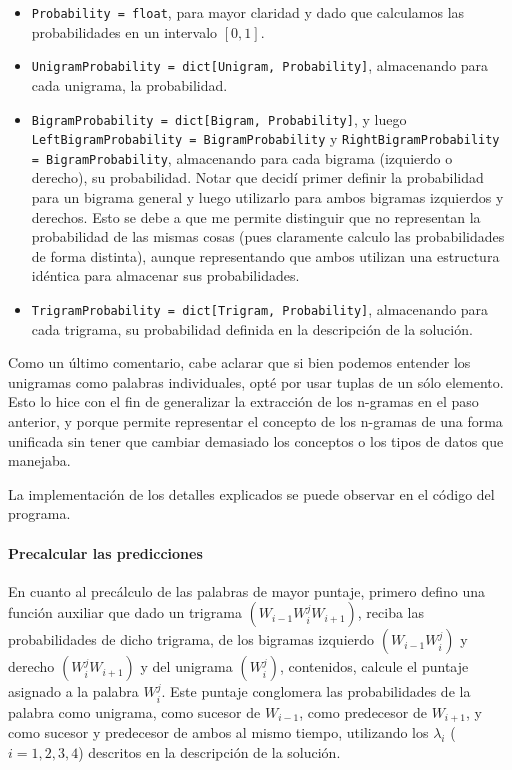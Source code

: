 \documentclass[a4paper]{article}
\begin{document}
\begin{itemize}
    \item \texttt{Probability = float}, para mayor claridad y dado que calculamos las probabilidades en un intervalo $[0,1]$.
    \item \texttt{UnigramProbability = dict[Unigram, Probability]}, almacenando para cada unigrama, la probabilidad.
    \item \texttt{BigramProbability = dict[Bigram, Probability]}, y luego \texttt{LeftBigramProbability = BigramProbability} y \texttt{RightBigramProbability = BigramProbability}, almacenando para cada bigrama (izquierdo o derecho), su probabilidad. Notar que decidí primer definir la probabilidad para un bigrama general y luego utilizarlo para ambos bigramas izquierdos y derechos. Esto se debe a que me permite distinguir que no representan la probabilidad de las mismas cosas (pues claramente calculo las probabilidades de forma distinta), aunque representando que ambos utilizan una estructura idéntica para almacenar sus probabilidades.
     \item \texttt{TrigramProbability = dict[Trigram, Probability]}, almacenando para cada trigrama, su probabilidad definida en la descripción de la solución.
\end{itemize}

Como un último comentario, cabe aclarar que si bien podemos entender los unigramas como palabras individuales, opté por usar tuplas de un sólo elemento. Esto lo hice con el fin de generalizar la extracción de los n-gramas en el paso anterior, y porque permite representar el concepto de los n-gramas de una forma unificada sin tener que cambiar demasiado los conceptos o los tipos de datos que manejaba. 

La implementación de los detalles explicados se puede observar en el código del programa.

\paragraph{Precalcular las predicciones}

En cuanto al precálculo de las palabras de mayor puntaje, primero defino una función auxiliar que dado un trigrama $(W_{i-1} W_i^j W_{i+1})$, reciba las probabilidades de dicho trigrama, de los bigramas izquierdo $(W_{i-1} W_i^j)$ y derecho $(W_i^j W_{i+1})$ y del unigrama $(W_i^j)$, contenidos, calcule el puntaje asignado a la palabra $W_i^j$. Este puntaje conglomera las probabilidades de la palabra como unigrama, como sucesor de $W_{i-1}$, como predecesor de $W_{i+1}$, y como sucesor y predecesor de ambos al mismo tiempo, utilizando los $\lambda_i$ ($i = 1,2,3,4$) descritos en la descripción de la solución.
\end{document}
